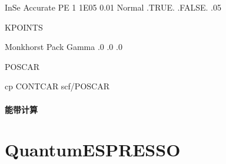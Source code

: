 \documentclass[a4paper,12pt,english]{sphinxmanual}
\begin{document}
\begin{sphinxVerbatim}[commandchars=\\\{\}]
  InSe
  
  
    Accurate
   
     PE
     
    
    
  \PYGZhy{}1
    
   1E\PYGZhy{}05
  \PYGZhy{}0.01
    Normal
   .TRUE.
   .FALSE.
  
   .05
  
    
\end{sphinxVerbatim}

\begin{DUlineblock}{0em}
\item[] KPOINTS
\end{DUlineblock}

\begin{sphinxVerbatim}[commandchars=\\\{\}]
Monkhorst Pack
Gamma
       
.0   .0   .0
\end{sphinxVerbatim}

\begin{DUlineblock}{0em}
\item[] POSCAR
\end{DUlineblock}

\begin{sphinxVerbatim}[commandchars=\\\{\}]
cp CONTCAR scf/POSCAR
\end{sphinxVerbatim}


\paragraph{能带计算}
\label{\detokenize{tutorials/vasp/mobility:id9}}

\section{Quantum\sphinxhyphen{}ESPRESSO}
\label{\detokenize{tutorial:quantum-espresso}}
\end{document}
